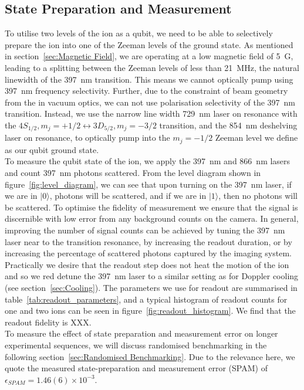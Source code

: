 \subsection{State Preparation and Measurement}

    To utilise two levels of the ion as a qubit, we need to be able to
    selectively prepare the ion into one of the Zeeman levels of the ground
    state. As mentioned in section~\ref{sec:Magnetic Field}, we are operating at
    a low magnetic field of 5~G, leading to a splitting between the Zeeman
    levels of less than 21~MHz, the natural linewidth of the 397~nm transition.
    This means we cannot optically pump using 397~nm frequency selectivity.
    Further, due to the constraint of beam geometry from the in vacuum optics,
    we can not use polarisation selectivity of the 397~nm transition. Instead,
    we use the narrow line width 729~nm laser on resonance with the $4S_{1/2},
    m_j = +1/2 \leftrightarrow 3D_{5/2}, m_j = -3/2$ transition, and the 854~nm
    deshelving laser on resonance, to optically pump into the $m_j = -1/2$
    Zeeman level we define as our qubit ground state. \\
    To measure the qubit state of the ion, we apply the 397~nm and 866~nm lasers
    and count 397~nm photons scattered. From the level diagram shown in
    figure~\ref{fig:level_diagram}, we can see that upon turning on the 397~nm
    laser, if we are in $|0\rangle$, photons will be scattered, and if we are in
    $|1\rangle$, then no photons will be scattered. To optimise the fidelity of
    measurement we ensure that the signal is discernible with low error from any
    background counts on the camera. In general, improving the number of signal
    counts can be achieved by tuning the 397~nm laser near to the transition
    resonance, by increasing the readout duration, or by increasing the
    percentage of scattered photons captured by the imaging system. Practically
    we desire that the readout step does not heat the motion of the ion and so
    we red detune the 397~nm laser to a similar setting as for Doppler cooling
    (see section~\ref{sec:Cooling}). The parameters we use for readout are
    summarised in table~\ref{tab:readout_parameters}, and a typical histogram of
    readout counts for one and two ions can be seen in
    figure~\ref{fig:readout_histogram}. We find that the readout fidelity is
    XXX.\\
    To measure the effect of state preparation and measurement error on longer
    experimental sequences, we will discuss randomised benchmarking in the following
    section~\ref{sec:Randomised Benchmarking}. Due to the relevance here, we
    quote the measured state-preparation and measurement error (SPAM) of $\epsilon_{SPAM} = 1.46(6) \times 10^{-3}$.\\
    
